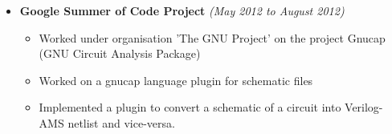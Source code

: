 \documentclass[a4paper,10pt]{article}
\newcommand{\resheading}[1]{{\small \colorbox{mygrey}{\begin{minipage}{0.975\textwidth}{\textbf{#1 \vphantom{p\^{E}}}}\end{minipage}}}}
\begin{document}
\begin{itemize}
    \item \textbf {Google Summer of Code Project} \hfill  \emph{(May 2012 to August 2012)} \\[-0.6cm]
    \begin{itemize}
        \item Worked under organisation 'The GNU Project' on the project Gnucap (GNU Circuit Analysis Package)\\[-0.6cm]
        \item Worked on a gnucap language plugin for schematic files \\[-0.6cm]
        \item Implemented a plugin to convert a schematic of a circuit into Verilog-AMS netlist and vice-versa.\\[-0.5cm]
    \end{itemize}
\end{itemize}
\end{document}
